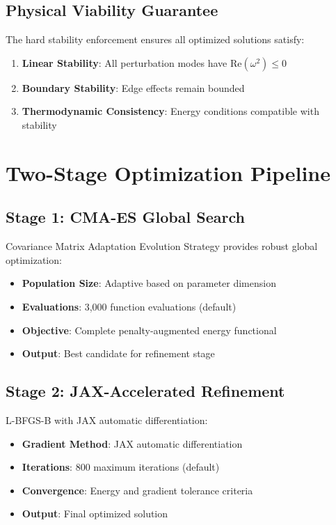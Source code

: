 \documentclass[11pt,a4paper]{article}
\begin{document}
\subsection{Physical Viability Guarantee}

The hard stability enforcement ensures all optimized solutions satisfy:
\begin{enumerate}
\item \textbf{Linear Stability}: All perturbation modes have $\text{Re}(\omega^2) \leq 0$
\item \textbf{Boundary Stability}: Edge effects remain bounded
\item \textbf{Thermodynamic Consistency}: Energy conditions compatible with stability
\end{enumerate}

\section{Two-Stage Optimization Pipeline}

\subsection{Stage 1: CMA-ES Global Search}

Covariance Matrix Adaptation Evolution Strategy provides robust global optimization:

\begin{itemize}
\item \textbf{Population Size}: Adaptive based on parameter dimension
\item \textbf{Evaluations}: 3,000 function evaluations (default)
\item \textbf{Objective}: Complete penalty-augmented energy functional
\item \textbf{Output}: Best candidate for refinement stage
\end{itemize}

\subsection{Stage 2: JAX-Accelerated Refinement}

L-BFGS-B with JAX automatic differentiation:

\begin{itemize}
\item \textbf{Gradient Method}: JAX automatic differentiation
\item \textbf{Iterations}: 800 maximum iterations (default)
\item \textbf{Convergence}: Energy and gradient tolerance criteria
\item \textbf{Output}: Final optimized solution
\end{itemize}
\end{document}
